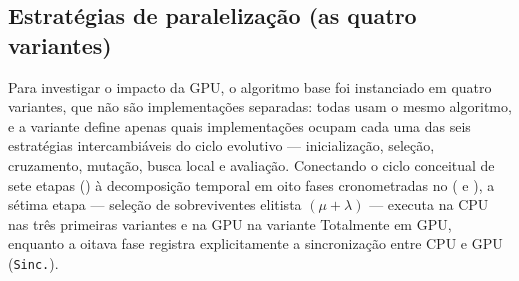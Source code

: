 \subsection{Estratégias de paralelização (as quatro variantes)}\label{sec-322-variantes}

Para investigar o impacto da GPU, o algoritmo base foi instanciado em quatro variantes, que não são implementações separadas: todas usam o mesmo algoritmo, e a variante define apenas quais implementações ocupam cada uma das seis estratégias intercambiáveis do ciclo evolutivo --- inicialização, seleção, cruzamento, mutação, busca local e avaliação.
Conectando o ciclo conceitual de sete etapas () à decomposição temporal em oito fases cronometradas no  ( e ), a sétima etapa --- seleção de sobreviventes elitista \((\mu + \lambda)\) --- executa na CPU nas três primeiras variantes e na GPU na variante Totalmente em GPU, enquanto a oitava fase registra explicitamente a sincronização entre CPU e GPU (\texttt{Sinc.}).

